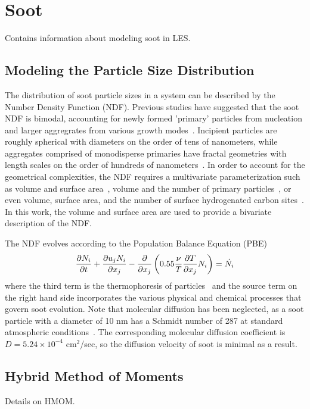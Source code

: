 \section{Soot}
\label{sec:lesmodels:soot}

Contains information about modeling soot in LES.


\subsection{Modeling the Particle Size Distribution}
\label{sec:lesmodels:soot:ndf}

The distribution of soot particle sizes in a system can be described by the Number Density Function (NDF). Previous studies have suggested that the soot NDF is bimodal, accounting for newly formed 'primary' particles from nucleation and larger aggregrates from various growth modes~\cite{zhao2003,zhao2005,netzell2007}. Incipient particles are roughly spherical with diameters on the order of tens of nanometers, while aggregates comprised of monodisperse primaries have fractal geometries with length scales on the order of hundreds of nanometers~\cite{vanderwal1999}. In order to account for the geometrical complexities, the NDF requires a multivariate parameterization such as volume and surface area~\cite{FILL IN}, volume and the number of primary particles~\cite{FILL IN}, or even volume, surface area, and the number of surface hydrogenated carbon sites~\cite{FILL IN}. In this work, the volume and surface area are used to provide a bivariate description of the NDF. 

The NDF evolves according to the Population Balance Equation (PBE)~\cite{friedlander2000}
\begin{equation}\label{eq:lesmodels:soot:ndf:pbe}
  \tder{N_i} - \pder[]{x_j}\left( 0.55\frac{\nu}{T}\pder[T]{x_j}N_i \right) = \dot{N_i}
\end{equation}
where the third term is the thermophoresis of particles~\cite{waldmann1966} and the source term on the right hand side incorporates the various physical and chemical processes that govern soot evolution. Note that molecular diffusion has been neglected, as a soot particle with a diameter of 10 nm has a Schmidt number of 287 at standard atmospheric conditions~\cite{friedlander2000}. The corresponding molecular diffusion coefficient is $D = 5.24\times 10^{-4}$ cm$^2$/sec, so the diffusion velocity of soot is minimal as a result.


\subsection{Hybrid Method of Moments}
\label{sec:lesmodels:soot:hmom}

Details on HMOM.
